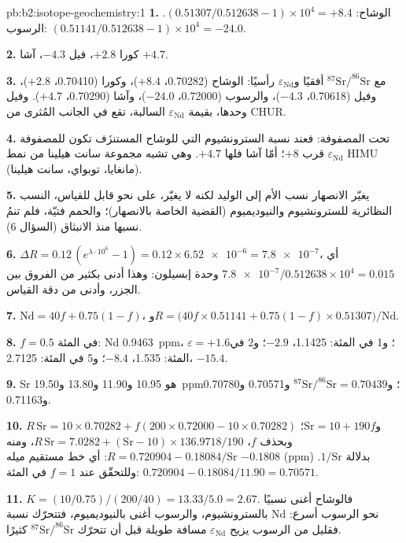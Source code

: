 \begin{solution}{pb:b2:isotope-geochemistry:1}
\textbf{1.} الوشاح: $(0.51307/0.512638 - 1)\times10^4 = +8.4$. الرسوب:
$(0.51141/0.512638 - 1)\times10^4 = -24.0$.

\textbf{2.} كورا $+2.8$، فيل $-4.3$، آشا $+4.7$.

\textbf{3.} مع $^{87}\mathrm{Sr}/^{86}\mathrm{Sr}$ أفقيًا و$\varepsilon_{\mathrm{Nd}}$ رأسيًا:
الوشاح (0.70282، $+8.4$)، وكورا (0.70410، $+2.8$)، وفيل (0.70618، $-4.3$)، والرسوب
(0.72000، $-24.0$)، وآشا (0.70290، $+4.7$). وفيل وحدها، بقيمة
$\varepsilon_{\mathrm{Nd}}$ السالبة، تقع في الجانب المُثرى من CHUR.

\textbf{4.} تحت المصفوفة: فعند نسبة السترونشيوم التي للوشاح المستنزَف تكون للمصفوفة
$\varepsilon_{\mathrm{Nd}}$ قرب $+8$؛ أمّا آشا فلها $+4.7$. وهي تشبه
مجموعة سانت هيلينا من نمط HIMU (مانغايا، توبواي، سانت هيلينا).

\textbf{5.} يغيّر الانصهار نسب الأم إلى الوليد لكنه لا يغيّر، على نحو قابل للقياس،
النسب النظائرية للسترونشيوم والنيوديميوم (القضية الخاصة بالانصهار)؛ والحمم
فتيّة، فلم تنمُ نسبها منذ الانبثاق (السؤال 6).

\textbf{6.} $\Delta R = 0.12\,(e^{\lambda\cdot10^6} - 1) = 0.12\times\num{6.52e-6} =
\num{7.8e-7}$، أي $\num{7.8e-7}/0.512638\times10^4 = 0.015$ وحدة إبسيلون: وهذا أدنى بكثير من
الفروق بين الجزر، وأدنى من دقة القياس.

\textbf{7.} $\mathrm{Nd} = 40f + 0.75(1-f)$،
و$R = \bigl(40f\times0.51141 + 0.75(1-f)\times0.51307\bigr)/\mathrm{Nd}$.

\textbf{8.} $f = 0.5$ في المئة: Nd \qty{0.9463}{ppm}، $\varepsilon = +1.6$؛ و1 في المئة:
1.1425، $-2.9$؛ و2 في المئة: 1.535، $-8.4$؛ و5 في المئة: 2.7125، $-15.4$.

\textbf{9.} Sr هو 10.95 و11.90 و13.80 و\qty{19.50}{ppm}؛ و$^{87}\mathrm{Sr}/^{86}\mathrm{Sr} =
0.70439$ و0.70571 و0.70780 و0.71163.

\textbf{10.} $R\,\mathrm{Sr} = 10\times0.70282 + f(200\times0.72000 - 10\times0.70282)$
و$\mathrm{Sr} = 10 + 190f$؛ وبحذف $f$، $R\,\mathrm{Sr} = 7.0282 +
(\mathrm{Sr}-10)\times136.9718/190$، ومنه $R = 0.720904 - 0.18084/\mathrm{Sr}$: أي خط
مستقيم ميله $-0.1808$ (ppm) بدلالة $1/\mathrm{Sr}$. وللتحقّق عند $f = 1$ في المئة:
$0.720904 - 0.18084/11.90 = 0.70571$.

\textbf{11.} $K = (10/0.75)/(200/40) = 13.33/5.0 = 2.67$. فالوشاح أغنى نسبيًا
بالسترونشيوم، والرسوب أغنى بالنيوديميوم، فتتحرّك نسبة Nd نحو
الرسوب أسرع: فقليل من الرسوب يزيح $\varepsilon_{\mathrm{Nd}}$ مسافة طويلة قبل أن
تتحرّك $^{87}\mathrm{Sr}/^{86}\mathrm{Sr}$ كثيرًا.


\end{solution}

